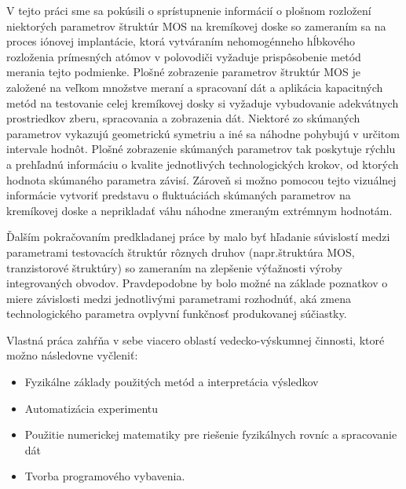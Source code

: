 \par V tejto práci sme sa pokúsili o sprístupnenie informácií o
plošnom rozložení niektorých parametrov štruktúr MOS na kremíkovej
doske so zameraním sa na proces iónovej implantácie, ktorá vytváraním
nehomogénneho hĺbkového rozloženia prímesných atómov v polovodiči
vyžaduje prispôsobenie metód merania tejto podmienke. Plošné
zobrazenie parametrov štruktúr MOS je založené na veľkom množstve
meraní a spracovaní dát a aplikácia kapacitných metód na testovanie
celej kremíkovej dosky si vyžaduje vybudovanie adekvátnych
prostriedkov zberu, spracovania a zobrazenia dát. Niektoré zo
skúmaných parametrov vykazujú geometrickú symetriu a iné sa náhodne
pohybujú v určitom intervale hodnôt. Plošné zobrazenie skúmaných
parametrov tak poskytuje rýchlu a prehľadnú informáciu o kvalite
jednotlivých technologických krokov, od ktorých hodnota skúmaného
parametra závisí. Zároveň si možno pomocou tejto vizuálnej informácie
vytvoriť predstavu o fluktuáciách skúmaných parametrov na kremíkovej
doske a neprikladať váhu náhodne zmeraným extrémnym hodnotám.

\par Ďalším pokračovaním predkladanej práce by malo byť hľadanie
súvislostí medzi parametrami testovacích štruktúr rôznych druhov
(napr.štruktúra MOS, tranzistorové štruktúry) so zameraním na
zlepšenie výťažnosti výroby integrovaných obvodov. Pravdepodobne by
bolo možné na základe poznatkov o miere závislosti medzi jednotlivými
parametrami rozhodnúť, aká zmena technologického parametra ovplyvní
funkčnosť produkovanej súčiastky.

\par Vlastná práca zahŕňa v sebe viacero oblastí vedecko-výskumnej
činnosti, ktoré možno následovne vyčleniť:
\begin{itemize}
\item Fyzikálne základy použitých metód a interpretácia výsledkov
\item Automatizácia experimentu
\item Použitie numerickej  matematiky pre riešenie fyzikálnych rovníc a spracovanie dát
\item Tvorba programového vybavenia.
\end{itemize}

